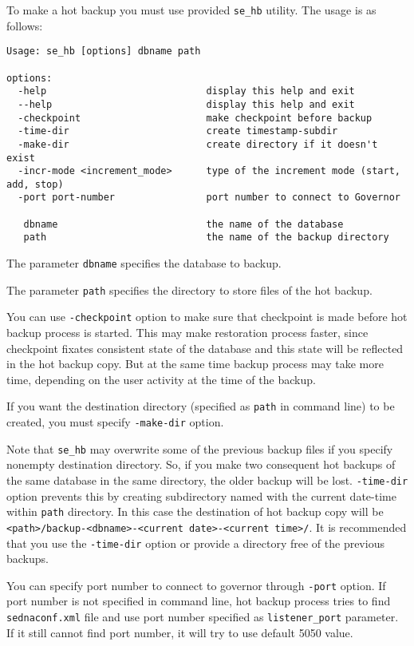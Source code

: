 \documentclass[a4paper,12pt]{article}
\begin{document}
To make a hot backup you must use provided \verb!se_hb! utility. The usage is as follows:
\begin{verbatim}
Usage: se_hb [options] dbname path

options:
  -help                            display this help and exit
  --help                           display this help and exit
  -checkpoint                      make checkpoint before backup
  -time-dir                        create timestamp-subdir
  -make-dir                        create directory if it doesn't exist
  -incr-mode <increment_mode>      type of the increment mode (start, add, stop)
  -port port-number                port number to connect to Governor

   dbname                          the name of the database
   path                            the name of the backup directory
\end{verbatim}

The parameter \verb!dbname! specifies the database to backup.

The parameter \verb!path! specifies the directory to store files of the hot backup.

You can use \verb!-checkpoint! option to make sure that checkpoint is made before hot backup process is started. This
may make restoration process faster, since checkpoint fixates consistent state of the database and this state will be reflected
in the hot backup copy. But at the same time backup process may take more time, depending on the user activity at the time
of the backup.

If you want the destination directory (specified as \verb!path! in command line) to be created, you must specify 
\verb!-make-dir! option.

Note that \verb!se_hb! may overwrite some of the 
previous backup files if you specify nonempty destination directory. So, if you make two consequent hot backups of the same
database in the same directory, the older backup will be lost. \verb!-time-dir! option prevents this by creating 
subdirectory named with the current date-time within \verb!path! directory. In this case the destination of hot backup copy 
will be \verb!<path>/backup-<dbname>-<current date>-<current time>/!. It is recommended that you use the \verb!-time-dir! 
option or provide a directory free of the previous backups.

You can specify port number to connect to governor through \verb!-port! option. If port number is not specified in command line,
hot backup process tries to find \verb!sednaconf.xml! file and use port number specified as \verb!listener_port! parameter.
If it still cannot find port number, it will try to use default 5050 value. 
\end{document}
